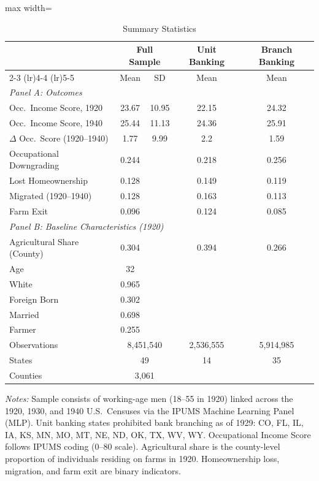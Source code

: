 \begin{table}[H]
\centering
\caption{Summary Statistics}
\begin{threeparttable}
\begin{adjustbox}{max width=\textwidth}
\begin{tabular}{lcccc}
\toprule
& \multicolumn{2}{c}{Full Sample} & Unit Banking & Branch Banking \\
\cmidrule(lr){2-3} \cmidrule(lr){4-4} \cmidrule(lr){5-5}
& Mean & SD & Mean & Mean \\
\midrule
\multicolumn{5}{l}{\textit{Panel A: Outcomes}} \\
Occ.\ Income Score, 1920 & 23.67 & 10.95 & 22.15 & 24.32 \\
Occ.\ Income Score, 1940 & 25.44 & 11.13 & 24.36 & 25.91 \\
$\Delta$ Occ.\ Score (1920--1940) & 1.77 & 9.99 & 2.2 & 1.59 \\
Occupational Downgrading & 0.244 & & 0.218 & 0.256 \\
Lost Homeownership & 0.128 & & 0.149 & 0.119 \\
Migrated (1920--1940) & 0.128 & & 0.163 & 0.113 \\
Farm Exit & 0.096 & & 0.124 & 0.085 \\
\midrule
\multicolumn{5}{l}{\textit{Panel B: Baseline Characteristics (1920)}} \\
Agricultural Share (County) & 0.304 & & 0.394 & 0.266 \\
Age & 32 & & & \\
White & 0.965 & & & \\
Foreign Born & 0.302 & & & \\
Married & 0.698 & & & \\
Farmer & 0.255 & & & \\
\midrule
Observations & \multicolumn{2}{c}{8,451,540} & 2,536,555 & 5,914,985 \\
States & \multicolumn{2}{c}{49} & 14 & 35 \\
Counties & \multicolumn{2}{c}{3,061} & & \\
\bottomrule
\end{tabular}
\end{adjustbox}
\begin{tablenotes}[flushleft]
\small
\item \textit{Notes:} Sample consists of working-age men (18--55 in 1920) linked across the 1920, 1930, and 1940 U.S.\ Censuses via the IPUMS Machine Learning Panel (MLP). Unit banking states prohibited bank branching as of 1929: CO, FL, IL, IA, KS, MN, MO, MT, NE, ND, OK, TX, WV, WY. Occupational Income Score follows IPUMS coding (0--80 scale). Agricultural share is the county-level proportion of individuals residing on farms in 1920. Homeownership loss, migration, and farm exit are binary indicators.
\end{tablenotes}
\end{threeparttable}
\label{tab:summary}
\end{table}
